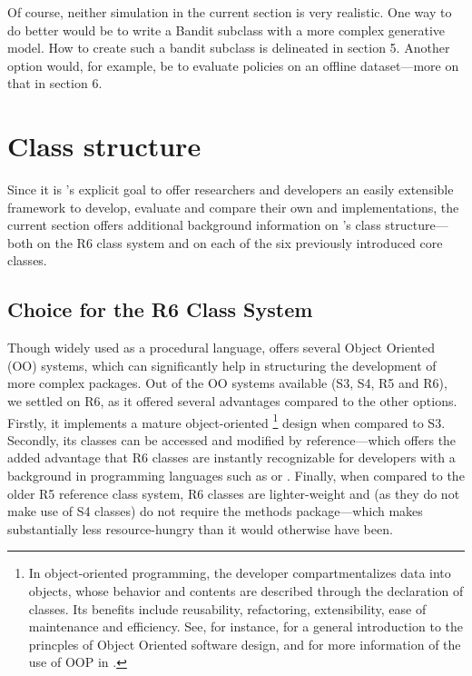 \documentclass{jss}
\begin{document}
Of course, neither simulation in the current section is very realistic. One way to do better would be to write a Bandit subclass with a more complex generative model. How to create such a bandit subclass is delineated in section 5. Another option would, for example, be to evaluate policies on an offline dataset---more on that in section 6.

\section{Class structure} \label{classstructure}

Since it is 's explicit goal to offer researchers and developers an easily extensible framework to develop, evaluate and compare their own  and  implementations, the current section offers additional background information on 's class structure---both on the R6 class system \cite{R6} and on each of the six previously introduced core  classes.

\subsection{Choice for the R6 Class System} \label{classsystem}

Though widely used as a procedural language,  offers several Object Oriented (OO) systems, which can significantly help in structuring the development of more complex packages. Out of the OO systems available (S3, S4, R5 and R6), we settled on R6, as it offered several advantages compared to the other options. Firstly, it implements a mature object-oriented \footnote{In object-oriented programming, the developer compartmentalizes data into objects, whose behavior and contents are described through the declaration of classes. Its benefits include reusability, refactoring, extensibility, ease of maintenance and efficiency. See, for instance, \cite{Wirfs-Brock1990} for a general introduction to the princples of Object Oriented software design, and \cite{wickham2014advanced} for more information of the use of OOP in .} design when compared to S3. Secondly, its classes can be accessed and modified by reference---which offers the added advantage that R6 classes are instantly recognizable for developers with a background in programming languages such as  or . Finally, when compared to the older R5 reference class system, R6 classes are lighter-weight and (as they do not make use of S4 classes) do not require the methods package---which makes  substantially less resource-hungry than it would otherwise have been.
\end{document}
